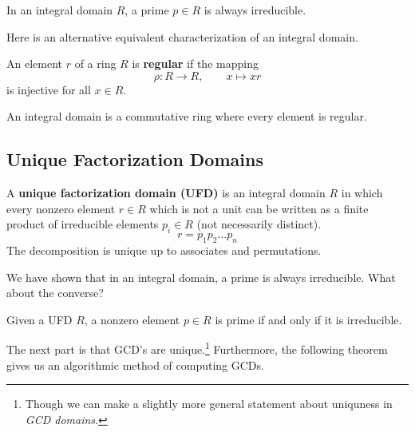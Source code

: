   \begin{theorem}
    In an integral domain $R$, a prime $p \in R$ is always irreducible. 
  \end{theorem}

  Here is an alternative equivalent characterization of an integral domain. 

  \begin{definition}
     An element $r$ of a ring $R$ is \textbf{regular} if the mapping 
     \begin{equation}
       \rho: R \longrightarrow R, \qquad x \mapsto x r
     \end{equation}
    is injective for all $x \in R$. 
  \end{definition}

  \begin{theorem}
    An integral domain is a commutative ring where every element is regular. 
  \end{theorem} 

\subsection{Unique Factorization Domains}

  \begin{definition}
    A \textbf{unique factorization domain (UFD)} is an integral domain $R$ in which every nonzero element $r \in R$ which is not a unit 
    can be written as a finite product of irreducible elements $p_i \in R$ (not necessarily distinct). 
    \begin{equation}
      r = p_1 p_2 \ldots p_n
    \end{equation}
    The decomposition is unique up to associates and permutations. 
  \end{definition}

  We have shown that in an integral domain, a prime is always irreducible. What about the converse? 

  \begin{theorem}
    Given a UFD $R$, a nonzero element $p \in R$ is prime if and only if it is irreducible. 
  \end{theorem}

  The next part is that GCD's are unique.\footnote{Though we can make a slightly more general statement about uniquness in \textit{GCD domains}.} Furthermore, the following theorem gives us an algorithmic method of computing GCDs.

